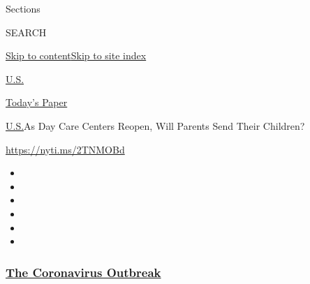 Sections

SEARCH

\protect\hyperlink{site-content}{Skip to
content}\protect\hyperlink{site-index}{Skip to site index}

\href{https://www.nytimes3xbfgragh.onion/section/us}{U.S.}

\href{https://myaccount.nytimes3xbfgragh.onion/auth/login?response_type=cookie\&client_id=vi}{}

\href{https://www.nytimes3xbfgragh.onion/section/todayspaper}{Today's
Paper}

\href{/section/us}{U.S.}\textbar{}As Day Care Centers Reopen, Will
Parents Send Their Children?

\url{https://nyti.ms/2TNMOBd}

\begin{itemize}
\item
\item
\item
\item
\item
\item
\end{itemize}

\hypertarget{the-coronavirus-outbreak}{%
\subsubsection{\texorpdfstring{\href{https://www.nytimes3xbfgragh.onion/news-event/coronavirus?name=styln-coronavirus-national\&region=TOP_BANNER\&variant=undefined\&block=storyline_menu_recirc\&action=click\&pgtype=Article\&impression_id=70b15600-e38f-11ea-baa5-e5648848321d}{The
Coronavirus
Outbreak}}{The Coronavirus Outbreak}}\label{the-coronavirus-outbreak}}


